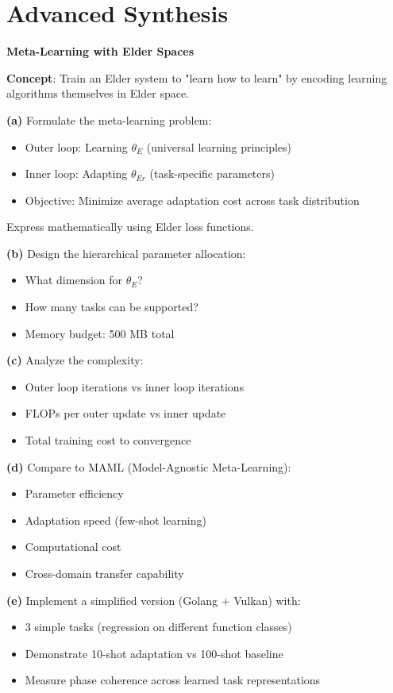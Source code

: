 \section{Advanced Synthesis}

\begin{challenge}
\textbf{Meta-Learning with Elder Spaces}

\textbf{Concept}: Train an Elder system to "learn how to learn" by encoding learning algorithms themselves in Elder space.

\textbf{(a)} Formulate the meta-learning problem:
\begin{itemize}
\item Outer loop: Learning $\theta_E$ (universal learning principles)
\item Inner loop: Adapting $\theta_{Er}$ (task-specific parameters)
\item Objective: Minimize average adaptation cost across task distribution
\end{itemize}

Express mathematically using Elder loss functions.

\textbf{(b)} Design the hierarchical parameter allocation:
\begin{itemize}
\item What dimension for $\theta_E$?
\item How many tasks can be supported?
\item Memory budget: 500 MB total
\end{itemize}

\textbf{(c)} Analyze the complexity:
\begin{itemize}
\item Outer loop iterations vs inner loop iterations
\item FLOPs per outer update vs inner update
\item Total training cost to convergence
\end{itemize}

\textbf{(d)} Compare to MAML (Model-Agnostic Meta-Learning):
\begin{itemize}
\item Parameter efficiency
\item Adaptation speed (few-shot learning)
\item Computational cost
\item Cross-domain transfer capability
\end{itemize}

\textbf{(e)} Implement a simplified version (Golang + Vulkan) with:
\begin{itemize}
\item 3 simple tasks (regression on different function classes)
\item Demonstrate 10-shot adaptation vs 100-shot baseline
\item Measure phase coherence across learned task representations
\end{itemize}
\end{challenge}

